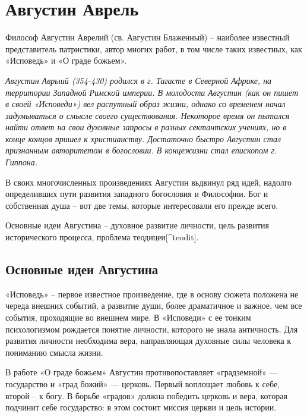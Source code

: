 \documentclass[
]{article}
\begin{document}
\hypertarget{ux430ux432ux433ux443ux441ux442ux438ux43d-ux430ux432ux440ux435ux43bux44c}{%
\section{Августин
Аврель}\label{ux430ux432ux433ux443ux441ux442ux438ux43d-ux430ux432ux440ux435ux43bux44c}}

Философ Августин Аврелий (св. Августин Блаженный) -- наиболее известный
представитель патристики, автор многих работ, в том числе таких
известных, как «Исповедь» и «О граде божьем».

\emph{Августин Аврыий (354-430) родился в г. Тагасте в Северной Африке,
на территории Западной Римской империи. В молодости Августин (как он
пишет в своей «Исповеди») вел распутный образ жизни, однако со временем
начал задумываться о смысле своего существования. Некоторое время он
пытался найти ответ на свои духовные запросы в разных сектантских
учениях, но в конце концов пришел к христианству. Достаточно быстро
Августин стал признанным авторитетом в богословии. В концежизни стал
епископом г. Гиппона.}

В своих многочисленных произведениях Августин вьдвинул ряд идей, надолго
определивших пути развития западного богословия и Философии. Бог и
собственная душа -- вот две темы, которые интересовали его прежде всего.

Основные идеи Августина -- духовное развитие личности, цель развития
исторического процесса, проблема теодицеи{[}\^{}teodit{]}.

\hypertarget{ux43eux441ux43dux43eux432ux43dux44bux435-ux438ux434ux435ux438-ux430ux432ux433ux443ux441ux442ux438ux43dux430}{%
\subsection{Основные идеи
Августина}\label{ux43eux441ux43dux43eux432ux43dux44bux435-ux438ux434ux435ux438-ux430ux432ux433ux443ux441ux442ux438ux43dux430}}

«Исповедь» -- первое известное произведение, где в основу сюжета
положена не череда внешних событий, а развитие души, более драматичное и
важное, чем все события, проходящие во внешнем мире. В «Исповеди» с ее
тонким психологизмом рождается понятие личности, которого не знала
античность. Для развития личности необходима вера, направляющая духовные
силы человека к пониманию смысла жизни.

В работе «О граде божьем» Августин противопоставляет «градземной» ---
государство и «град божий» --- церковь. Первый воплощает любовь к себе,
второй -- к богу. В борьбе «градов» должна победить церковь и вера,
которая подчинит себе государство: в этом состоит миссия церкви и цель
истории.
\end{document}
